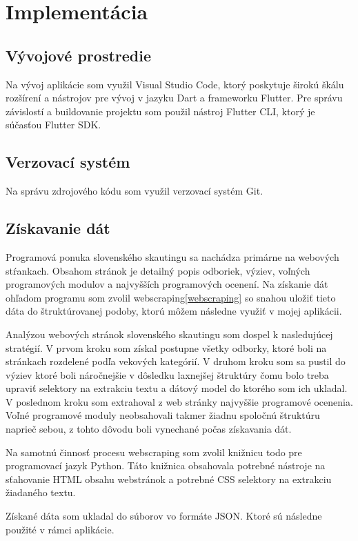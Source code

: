 \chapter{Implementácia}

\section{Vývojové prostredie}
Na vývoj aplikácie som využil Visual Studio Code, ktorý poskytuje širokú škálu rozšírení a nástrojov pre vývoj v jazyku Dart a frameworku Flutter. Pre správu závislostí a buildovanie projektu som použil nástroj Flutter CLI, ktorý je súčasťou Flutter SDK.

\section{Verzovací systém}
Na správu zdrojového kódu som využil verzovací systém Git.

\section{Získavanie dát}
Programová ponuka slovenského skautingu sa nachádza primárne na webových stŕankach. Obsahom stránok je detailný popis odboriek, výziev, voľných programových modulov a najvyšších programových ocenení. Na získanie dát ohľadom programu som zvolil webscraping\ref{webscraping} so snahou uložiť tieto dáta do štruktúrovanej podoby, ktorú môžem následne využiť v mojej aplikácii.

Analýzou webových stránok slovenského skautingu som dospel k nasledujúcej stratégií. V prvom kroku som získal postupne všetky odborky, ktoré boli na stránkach rozdelené podľa vekových kategórií. V druhom kroku som sa pustil do výziev ktoré boli náročnejšie v dôsledku laxnejšej štruktúry čomu bolo treba upraviť selektory na extrakciu textu a dátový model do ktorého som ich ukladal. V poslednom kroku som extrahoval z web stránky najvyššie programové ocenenia. Voľné programové moduly neobsahovali takmer žiadnu spoločnú štruktúru naprieč sebou, z tohto dôvodu boli vynechané počas získavania dát.

Na samotnú činnosť procesu webscraping som zvolil knižnicu todo pre programovací jazyk Python. Táto knižnica obsahovala potrebné nástroje na sťahovanie HTML obsahu webstránok a potrebné CSS selektory na extrakciu žiadaného textu.

Získané dáta som ukladal do súborov vo formáte JSON. Ktoré sú následne použité v rámci aplikácie.

